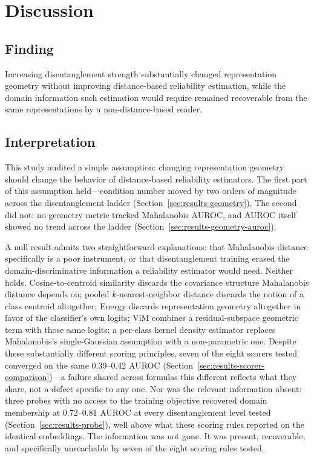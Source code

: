 \section{Discussion}
\label{sec:discussion}

\subsection{Finding}
\label{sec:discussion-finding}

Increasing disentanglement strength substantially changed representation geometry without improving distance-based reliability estimation, while the domain information such estimation would require remained recoverable from the same representations by a non-distance-based reader.

\subsection{Interpretation}
\label{sec:discussion-interpretation}

This study audited a simple assumption: changing representation geometry should change the behavior of distance-based reliability estimators. The first part of this assumption held---condition number moved by two orders of magnitude across the disentanglement ladder (Section~\ref{sec:results-geometry}). The second did not: no geometry metric tracked Mahalanobis AUROC, and AUROC itself showed no trend across the ladder (Section~\ref{sec:results-geometry-auroc}).

A null result admits two straightforward explanations: that Mahalanobis distance specifically is a poor instrument, or that disentanglement training erased the domain-discriminative information a reliability estimator would need. Neither holds. Cosine-to-centroid similarity discards the covariance structure Mahalanobis distance depends on; pooled $k$-nearest-neighbor distance discards the notion of a class centroid altogether; Energy \citep{liu2020energy} discards representation geometry altogether in favor of the classifier's own logits; ViM \citep{wang2022vim} combines a residual-subspace geometric term with those same logits; a per-class kernel density estimator replaces Mahalanobis's single-Gaussian assumption with a non-parametric one. Despite these substantially different scoring principles, seven of the eight scorers tested converged on the same 0.39--0.42 AUROC (Section~\ref{sec:results-scorer-comparison})---a failure shared across formulas this different reflects what they share, not a defect specific to any one. Nor was the relevant information absent: three probes with no access to the training objective recovered domain membership at 0.72--0.81 AUROC at every disentanglement level tested (Section~\ref{sec:results-probe}), well above what these scoring rules reported on the identical embeddings. The information was not gone. It was present, recoverable, and specifically unreachable by seven of the eight scoring rules tested.

